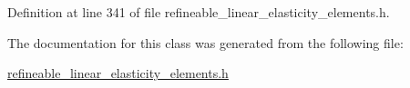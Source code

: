 Definition at line 341 of file refineable\+\_\+linear\+\_\+elasticity\+\_\+elements.\+h.



The documentation for this class was generated from the following file\+:\begin{DoxyCompactItemize}
\item 
\hyperlink{refineable__linear__elasticity__elements_8h}{refineable\+\_\+linear\+\_\+elasticity\+\_\+elements.\+h}\end{DoxyCompactItemize}
